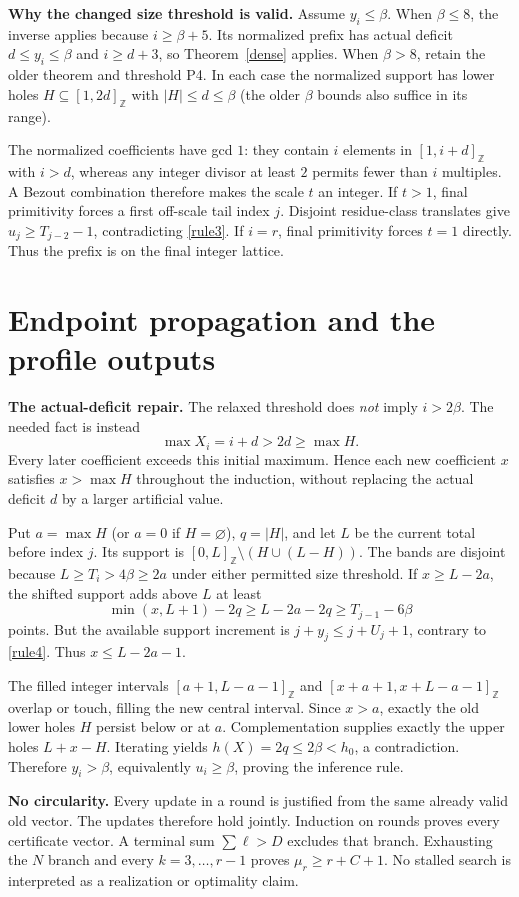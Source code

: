 \documentclass[11pt,a4paper]{article}
\newcommand{\Z}{\mathbb Z}
\newcommand{\ints}[2]{[#1,#2]_{\Z}}
\begin{document}
\textbf{Why the changed size threshold is valid.} Assume $y_i\le\beta$. When $\beta\le8$, the inverse applies because $i\ge\beta+5$. Its normalized prefix has actual deficit $d\le y_i\le\beta$ and $i\ge d+3$, so Theorem~\ref{dense} applies. When $\beta>8$, retain the older theorem and threshold P4. In each case the normalized support has lower holes $H\subseteq\ints1{2d}$ with $|H|\le d\le\beta$ (the older $\beta$ bounds also suffice in its range).

The normalized coefficients have gcd $1$: they contain $i$ elements in $\ints1{i+d}$ with $i>d$, whereas any integer divisor at least $2$ permits fewer than $i$ multiples. A Bezout combination therefore makes the scale $t$ an integer. If $t>1$, final primitivity forces a first off-scale tail index $j$. Disjoint residue-class translates give $u_j\ge T_{j-2}-1$, contradicting \eqref{rule3}. If $i=r$, final primitivity forces $t=1$ directly. Thus the prefix is on the final integer lattice.

\newpage
\section{Endpoint propagation and the profile outputs}
\textbf{The actual-deficit repair.} The relaxed threshold does \emph{not} imply $i>2\beta$. The needed fact is instead
\[
\max X_i=i+d>2d\ge\max H.
\]
Every later coefficient exceeds this initial maximum. Hence each new coefficient $x$ satisfies $x>\max H$ throughout the induction, without replacing the actual deficit $d$ by a larger artificial value.

Put $a=\max H$ (or $a=0$ if $H=\varnothing$), $q=|H|$, and let $L$ be the current total before index $j$. Its support is $\ints0L\setminus(H\cup(L-H))$. The bands are disjoint because $L\ge T_i>4\beta\ge2a$ under either permitted size threshold. If $x\ge L-2a$, the shifted support adds above $L$ at least
\[
\min(x,L+1)-2q\ge L-2a-2q\ge T_{j-1}-6\beta
\]
points. But the available support increment is $j+y_j\le j+U_j+1$, contrary to \eqref{rule4}. Thus $x\le L-2a-1$.

The filled integer intervals $\ints{a+1}{L-a-1}$ and $\ints{x+a+1}{x+L-a-1}$ overlap or touch, filling the new central interval. Since $x>a$, exactly the old lower holes $H$ persist below or at $a$. Complementation supplies exactly the upper holes $L+x-H$. Iterating yields $h(X)=2q\le2\beta<h_0$, a contradiction. Therefore $y_i>\beta$, equivalently $u_i\ge\beta$, proving the inference rule.

\textbf{No circularity.} Every update in a round is justified from the same already valid old vector. The updates therefore hold jointly. Induction on rounds proves every certificate vector. A terminal sum $\sum\ell>D$ excludes that branch. Exhausting the $N$ branch and every $k=3,\ldots,r-1$ proves $\mu_r\ge r+C+1$. No stalled search is interpreted as a realization or optimality claim.
\end{document}
